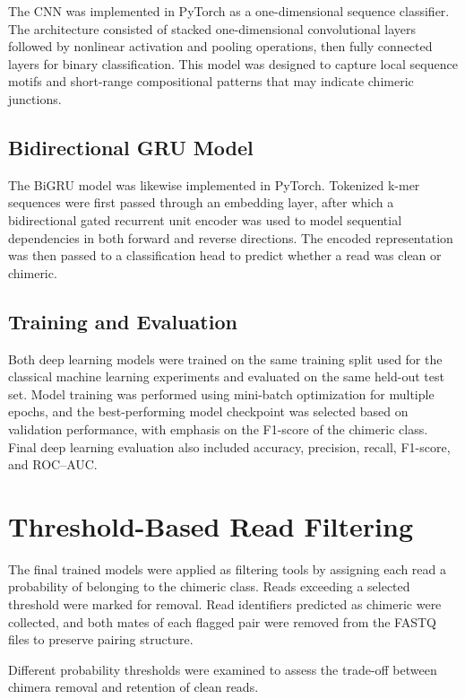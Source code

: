 The CNN was implemented in PyTorch as a one-dimensional sequence classifier. The architecture consisted of stacked one-dimensional convolutional layers followed by nonlinear activation and pooling operations, then fully connected layers for binary classification. This model was designed to capture local sequence motifs and short-range compositional patterns that may indicate chimeric junctions.

\subsection{Bidirectional GRU Model}

The BiGRU model was likewise implemented in PyTorch. Tokenized k-mer sequences were first passed through an embedding layer, after which a bidirectional gated recurrent unit encoder was used to model sequential dependencies in both forward and reverse directions. The encoded representation was then passed to a classification head to predict whether a read was clean or chimeric.

\subsection{Training and Evaluation}

Both deep learning models were trained on the same training split used for the classical machine learning experiments and evaluated on the same held-out test set. Model training was performed using mini-batch optimization for multiple epochs, and the best-performing model checkpoint was selected based on validation performance, with emphasis on the F1-score of the chimeric class. Final deep learning evaluation also included accuracy, precision, recall, F1-score, and ROC--AUC.

\section{Threshold-Based Read Filtering}

The final trained models were applied as filtering tools by assigning each read a probability of belonging to the chimeric class. Reads exceeding a selected threshold were marked for removal. Read identifiers predicted as chimeric were collected, and both mates of each flagged pair were removed from the FASTQ files to preserve pairing structure.

Different probability thresholds were examined to assess the trade-off between chimera removal and retention of clean reads.

